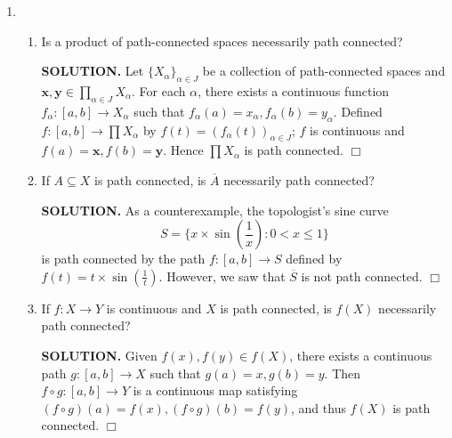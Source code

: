 \documentclass{article}
\begin{document}
\begin{enumerate}
\begin{enumerate}
        {\bf SOLUTION.} If $y \in (-\infty, 0)$ then $y - 1 \in (-\infty, -1) \cup[0, \infty)$ satisfies $f(y-1) = y$, and otherwise if $y \in [0, \infty)$ then $y \in (-\infty, -1) \cup[0, \infty)$ satisfies $f(y) = y$, showing that $f$ is surjective. Moreover $f$ is clearly order-preserving; the only nontrivial case is $x < -1$ and $y \geq 0$, for which
        $$f(x) = x+1 < 0 \geq y = f(y).$$
        However, $f$ cannot be a homeomorphism as $(-\infty, -1) \cup [0, \infty)$ is not connected, unlike $\reals$. This is because $(-\infty, -1) \cup[0, \infty)$ is not convex, and thus the subspace topology is not necessarily the same as the order topology, while (a) works only if $X, Y$ are in the order topology. $\Box$
    \end{enumerate}

    \item \begin{enumerate}
        \item Is a product of path-connected spaces necessarily path connected?

        {\bf SOLUTION.} Let $\{X_\alpha\}_{\alpha \in J}$ be a collection of path-connected spaces and $\mathbf{x}, \mathbf{y} \in \prod_{\alpha \in J} X_\alpha$. For each $\alpha$, there exists a continuous function $f_\alpha: [a, b] \rightarrow X_\alpha$ such that $f_\alpha(a) = x_\alpha, f_\alpha(b) = y_\alpha$. Defined $f: [a, b] \rightarrow \prod X_\alpha$ by $f(t) = (f_\alpha(t))_{\alpha \in J}$; $f$ is continuous and $f(a) = \mathbf{x}, f(b) = \mathbf{y}$. Hence $\prod X_\alpha$ is path connected. $\Box$
        
        \item If $A \subseteq X$ is path connected, is $\overline{A}$ necessarily path connected?

        {\bf SOLUTION.} As a counterexample, the topologist's sine curve 
        $$S = \{x \times \sin \left(\frac1x\right): 0 < x \leq 1\}$$
        is path connected by the path $f: [a, b] \rightarrow S$ defined by $f(t) = t \times \sin \left(\frac1t\right)$. However, we saw that $\overline{S}$ is not path connected. $\Box$

        \item If $f: X\rightarrow Y$ is continuous and $X$ is path connected, is $f(X)$ necessarily path connected?

        {\bf SOLUTION.} Given $f(x), f(y) \in f(X)$, there exists a continuous path $g: [a, b] \rightarrow X$ such that $g(a) = x, g(b) = y$. Then $f \circ g: [a, b] \rightarrow Y$ is a continuous map satisfying $(f \circ g)(a) = f(x), (f\circ g)(b) = f(y)$, and thus $f(X)$ is path connected. $\Box$


\end{enumerate}
\end{enumerate}
\end{document}
